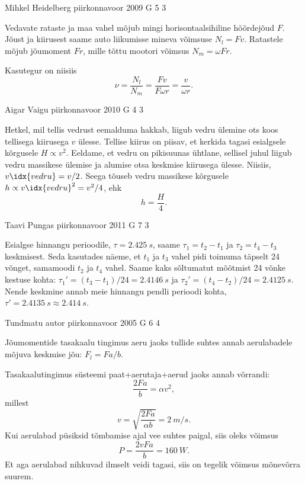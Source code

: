 \documentclass[11pt, twoside]{article}
\begin{document}
{%
{Mihkel Heidelberg} %
{piirkonnavoor} %
{2009} %
{G 5} %
{3} %
{

\ifSolution
Vedavate rataste ja maa vahel mõjub mingi horisontaalsihiline hõõrdejõud $F$. Jõust ja kiirusest saame auto liikumisse mineva võimsuse $N_l = Fv$. Ratastele mõjub jõumoment $Fr$, mille tõttu mootori võimsus $N_{m}=\omega F r$.

Kasutegur on niisiis
\[
\nu=\frac{N_{l}}{N_{m}}=\frac{F v}{F \omega r}=\frac{v}{\omega r}.
\]
\fi
}

{Aigar Vaigu} %
{piirkonnavoor} %
{2010} %
{G 4} %
{3} %
{

\ifSolution
Hetkel, mil tellis vedrust eemalduma hakkab, liigub vedru ülemine ots koos tellisega kiirusega $v$ ülesse. Tellise kiirus on piisav, et kerkida tagasi esialgsele kõrgusele $H\propto v^2$. Eeldame, et vedru on pikisuunas ühtlane, sellisel juhul liigub vedru massikese ülemise ja alumise otsa keskmise kiirusega ülesse. Niisiis, $v\idx{vedru}=v/2$. Seega tõuseb vedru massikese kõrgusele $h\propto v\idx{vedru}^2=v^2/4$, ehk
\[h=\frac{H}{4}.\]
\fi
}

{Taavi Pungas} %
{piirkonnavoor} %
{2011} %
{G 7} %
{3} %
{

\ifSolution
Esialgse hinnangu perioodile, $\tau = \SI{2,425}{s}$, saame $\tau_1 = t_2 - t_1$ ja $\tau_2 = t_4 - t_3$
keskmisest. Seda kasutades näeme, et $t_1$ ja $t_3$ vahel pidi toimuma täpselt \num{24} võnget,
samamoodi $t_2$ ja $t_4$ vahel. Saame kaks sõltumatut mõõtmist \num{24} võnke kestuse kohta:
$\tau_1' = (t_3-t_1)/\num{24} = \SI{2,4146}{s}$ ja $\tau_2'= (t_4-t_2)/\num{24} = \SI{2,4125}{s}$. Nende keskmine annab
meie hinnangu pendli perioodi kohta, $\tau' = \SI{2,4135}{s} \approx \SI{2,414}{s}$.
\fi
}

{Tundmatu autor} %
{piirkonnavoor} %
{2005} %
{G 6} %
{4} %
{

\ifSolution
Jõumomentide tasakaalu tingimus aeru jaoks tullide suhtes annab aerulabadele mõjuva keskmise jõu: $F_l = F a/b$.

Tasakaalutingimus süsteemi paat+aerutaja+aerud jaoks annab võrrandi: 
\[
\frac{2Fa}{b} = \alpha v^2 ,
\]
millest
\[
v=\sqrt{\frac{2 F a}{\alpha b}}=\SI{2}{m/s}.
\]
Kui aerulabad püsiksid tõmbamise ajal vee suhtes paigal, siis oleks võimsus
\[
P=\frac{2 v F a}{b}=\SI{160}{W}.
\]
Et aga aerulabad nihkuvad ilmselt veidi tagasi, siis on tegelik võimsus mõnevõrra suurem.
\fi
}

}
\end{document}
